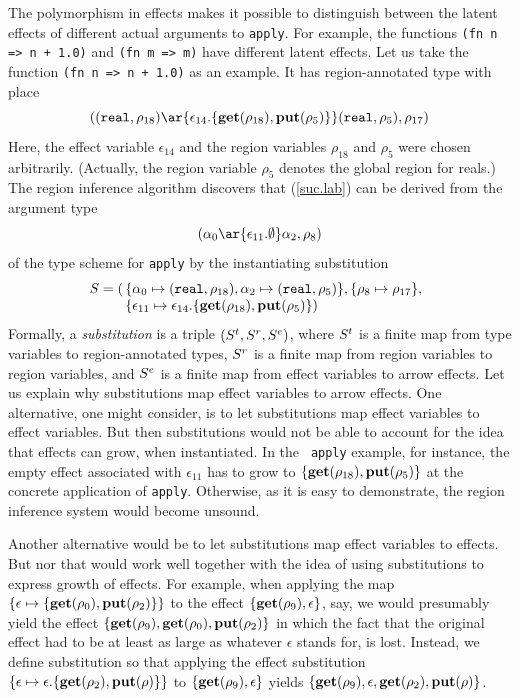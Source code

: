 \documentclass[12pt]{book}
\begin{document}
The polymorphism in effects makes it possible to distinguish between
the latent effects of different actual arguments to {\tt apply}. For
example, the functions {\tt (fn n => n + 1.0)} and {\tt (fn m => m)}
have different latent effects. Let us take the function {\tt (fn n =>
  n + 1.0)} as an example. It has region-annotated type with place
\begin{equation}
\label{suc.lab}
((\boxml{real},\rho_{18})\ar{\epsilon_{14}.\{\Get(\rho_{18}),\Put(\rho_5)\}}(\boxml{real}, \rho_5), \rho_{17})
\end{equation}
Here, the effect variable $\epsilon_{14}$ and the region variables
$\rho_{18}$ and $\rho_5$ were chosen arbitrarily. (Actually, the
region variable $\rho_5$ denotes the global region for reals.) The
region inference algorithm discovers that (\ref{suc.lab}) can be
derived from the argument type
$$(\alpha_0\ar{\epsilon_{11}.\emptyset}\alpha_2,\rho_8)$$
of the type scheme for {\tt apply} by the instantiating substitution
$$S =(\!\!\begin{array}[t]{l}\{\alpha_0\mapsto(\hbox{\tt real},\rho_{18}),\alpha_2\mapsto(\hbox{\tt real}, \rho_5)\},\{
       \rho_8\mapsto\rho_{17}\},\\
     \{\epsilon_{11}\mapsto\epsilon_{14}.\{\mathop{\bf get}\nolimits(\rho_{18}),\mathop{\bf put}\nolimits(\rho_5)\})
   \end{array}$$
Formally, a
%
{\em substitution\/} is a triple $(S^t,S^r,S^e)$, where $S^t$ is a
finite map from type variables to region-annotated types, $S^r$ is a
finite map from region variables to region variables, and $S^e$ is a
finite map from effect variables to arrow effects.  Let us explain why
substitutions map effect variables to arrow effects.  One alternative,
one might consider, is to let substitutions map effect variables to
effect variables. But then substitutions would not be able to account
for the idea that effects can grow, when instantiated. In the {\tt
  apply} example, for instance, the empty effect associated with
$\epsilon_{11}$ has to grow to $\{\mathop{\bf get}\nolimits(\rho_{18}),\mathop{\bf put}\nolimits(\rho_5)\}$ at
the concrete application of {\tt apply}. Otherwise, as it is easy to
demonstrate, the region inference system would become unsound.

Another alternative would be to let substitutions map effect variables
to effects. But nor that would work well together with the idea of
using substitutions to express growth of effects. For example,
when applying the map $\{\epsilon\mapsto\{\mathop{\bf get}\nolimits(\rho_0),\mathop{\bf put}\nolimits(\rho_2)\}\}$ to
the effect $\{\mathop{\bf get}\nolimits(\rho_9),\epsilon\}$, say, we would presumably yield
the effect $\{\mathop{\bf get}\nolimits(\rho_9),\mathop{\bf get}\nolimits(\rho_0),\mathop{\bf put}\nolimits(\rho_2)\}$ in which the
fact that the original effect had to be at least as large as whatever
$\epsilon$ stands for, is lost.  Instead, we define substitution so
that applying the effect substitution
$\{\epsilon\mapsto\epsilon.\{\mathop{\bf get}\nolimits(\rho_2),\mathop{\bf put}\nolimits(\rho)\}\}$ to
$\{\mathop{\bf get}\nolimits(\rho_9),\epsilon\}$ yields
$\{\mathop{\bf get}\nolimits(\rho_9),\epsilon,\mathop{\bf get}\nolimits(\rho_2),\mathop{\bf put}\nolimits(\rho)\}$.
\end{document}
